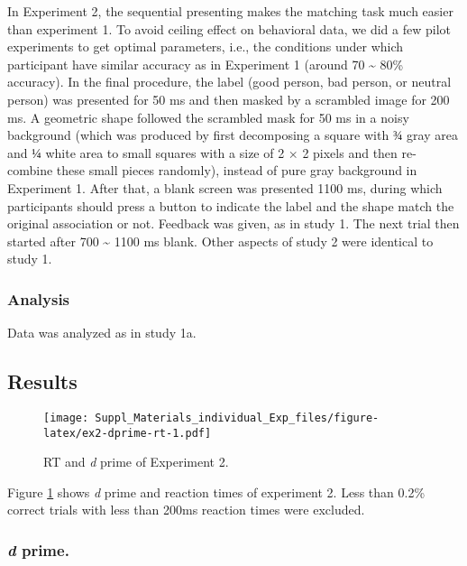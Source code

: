 \documentclass[
  english,
  man]{apa6}
\begin{document}
In Experiment 2, the sequential presenting makes the matching task much easier than experiment 1. To avoid ceiling effect on behavioral data, we did a few pilot experiments to get optimal parameters, i.e., the conditions under which participant have similar accuracy as in Experiment 1 (around 70 \textasciitilde{} 80\% accuracy).
In the final procedure, the label (good person, bad person, or neutral person) was presented for 50 ms and then masked by a scrambled image for 200 ms. A geometric shape followed the scrambled mask for 50 ms in a noisy background (which was produced by first decomposing a square with \(¾\) gray area and \(¼\) white area to small squares with a size of 2 × 2 pixels and then re-combine these small pieces randomly), instead of pure gray background in Experiment 1. After that, a blank screen was presented 1100 ms, during which participants should press a button to indicate the label and the shape match the original association or not. Feedback was given, as in study 1. The next trial then started after 700 \textasciitilde{} 1100 ms blank. Other aspects of study 2 were identical to study 1.

\hypertarget{analysis}{%
\subsubsection{Analysis}\label{analysis}}

Data was analyzed as in study 1a.

\hypertarget{results-3}{%
\subsection{Results}\label{results-3}}

\begin{figure}
\centering
\texttt{[image: Suppl\_Materials\_individual\_Exp\_files/figure-latex/ex2-dprime-rt-1.pdf]}
\caption{\label{fig:ex2-dprime-rt}RT and \emph{d} prime of Experiment 2.}
\end{figure}

Figure \ref{fig:ex2-dprime-rt} shows \emph{d} prime and reaction times of experiment 2. Less than 0.2\% correct trials with less than 200ms reaction times were excluded.

\hypertarget{d-prime.}{%
\subsubsection{\texorpdfstring{\emph{d} prime.}{d prime.}}\label{d-prime.}}
\end{document}
